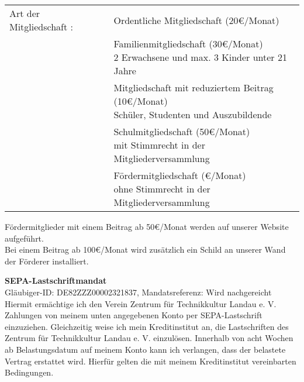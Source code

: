 \documentclass[a4paper, 11pt]{scrartcl}
\begin{document}
\begin{Form}
\begin{tabularx}{\linewidth}{lcX}
	Art der Mitgliedschaft : 	& \makecell{\CheckBox[name=ord, width=0.6cm, height=0.6cm, bordercolor=0 0 0]{}} & 
									Ordentliche Mitgliedschaft (20\euro/Monat)\\[2ex]
								& \makecell{\CheckBox[name=fam, width=0.6cm, height=0.6cm, bordercolor=0 0 0]{}} & 
									\parbox{10cm}{Familienmitgliedschaft (30\euro/Monat) \\ {\tiny 2 Erwachsene und max. 3 Kinder unter 21 Jahre}}\\[2ex]
								& \makecell{\CheckBox[name=red, width=0.6cm, height=0.6cm, bordercolor=0 0 0]{}} & 
									\parbox{10cm}{Mitgliedschaft mit reduziertem Beitrag (10\euro/Monat) \\ {\tiny Schüler, Studenten und Auszubildende} }\\[2ex]
								& \makecell{\CheckBox[name=sch, width=0.6cm, height=0.6cm, bordercolor=0 0 0]{}} & 
									\parbox{10cm}{Schulmitgliedschaft (50\euro/Monat) \\ {\tiny mit Stimmrecht in der Mitgliederversammlung} }\\[2ex]
								& \makecell{\CheckBox[name=foe, width=0.6cm, height=0.6cm, bordercolor=0 0 0]{}} & 
									\parbox{10cm}{Fördermitgliedschaft (\euro/Monat) \\ {\tiny ohne Stimmrecht in der Mitgliederversammlung}}\\[2ex]

\end{tabularx}
\end{Form}
Fördermitglieder mit einem Beitrag ab 50\euro/Monat werden auf unserer Website aufgeführt. \\
Bei einem Beitrag ab 100\euro/Monat wird zusätzlich ein Schild an unserer Wand der Förderer installiert.

\newpage

\textbf{SEPA-Lastschriftmandat}\\
Gläubiger-ID: DE82ZZZ00002321837, Mandatsreferenz: Wird nachgereicht\\  
Hiermit ermächtige ich den Verein Zentrum für Technikkultur Landau e. V. Zahlungen von meinem unten angegebenen Konto per SEPA-Lastschrift einzuziehen. Gleichzeitig weise ich mein Kreditinstitut an, die Lastschriften des Zentrum für Technikkultur Landau e. V. einzulösen. 
Innerhalb von acht Wochen ab Belastungsdatum auf meinem Konto kann ich verlangen, dass der belastete Vertrag erstattet wird. Hierfür gelten die mit meinem Kreditinstitut vereinbarten Bedingungen.\\
\end{document}
